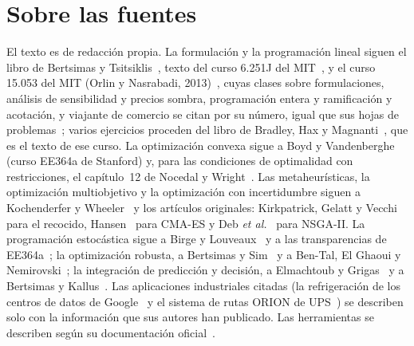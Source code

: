 \documentclass[11pt,a4paper,twoside,openany]{book}
\begin{document}
\section*{Sobre las fuentes}
El texto es de redacción propia. La formulación y la programación lineal siguen el libro de Bertsimas y Tsitsiklis~\cite{bt}, texto del curso 6.251J del MIT~\cite{mit6251}, y el curso 15.053 del MIT (Orlin y Nasrabadi, 2013)~\cite{mit15053}, cuyas clases sobre formulaciones, análisis de sensibilidad y precios sombra, programación entera y ramificación y acotación, y viajante de comercio se citan por su número, igual que sus hojas de problemas~\cite{mit15053ps}; varios ejercicios proceden del libro de Bradley, Hax y Magnanti~\cite{amp}, que es el texto de ese curso. La optimización convexa sigue a Boyd y Vandenberghe~\cite{bv} (curso EE364a de Stanford) y, para las condiciones de optimalidad con restricciones, el capítulo~12 de Nocedal y Wright~\cite{nw}. Las metaheurísticas, la optimización multiobjetivo y la optimización con incertidumbre siguen a Kochenderfer y Wheeler~\cite{kw} y los artículos originales: Kirkpatrick, Gelatt y Vecchi~\cite{kirkpatrick} para el recocido, Hansen~\cite{hansen} para CMA-ES y Deb \emph{et al.}~\cite{nsga2} para NSGA-II. La programación estocástica sigue a Birge y Louveaux~\cite{bl} y a las transparencias de EE364a~\cite{ee364stoch}; la optimización robusta, a Bertsimas y Sim~\cite{bsim} y a Ben-Tal, El Ghaoui y Nemirovski~\cite{btn}; la integración de predicción y decisión, a Elmachtoub y Grigas~\cite{spo} y a Bertsimas y Kallus~\cite{bk}. Las aplicaciones industriales citadas (la refrigeración de los centros de datos de Google~\cite{deepmind} y el sistema de rutas ORION de UPS~\cite{orion}) se describen solo con la información que sus autores han publicado. Las herramientas se describen según su documentación oficial~\cite{highs,ortools-vrptw,ortools-js,ortools-cpsat,cvxpy,cvxpydoc,pulp}.
\end{document}

